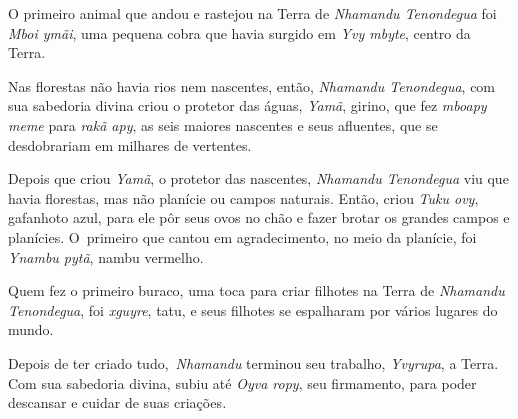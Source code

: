 
O primeiro animal que andou e rastejou na Terra de \emph{Nhamandu
Tenondegua} foi \emph{Mboi ymãi}, uma pequena cobra que havia surgido em
\emph{Yvy mbyte}, centro da Terra.

Nas florestas não havia rios nem nascentes, então, \emph{Nhamandu
Tenondegua}, com sua sabedoria divina criou o protetor das águas,
\emph{Yamã}, girino, que fez \emph{mboapy meme} para \emph{rakã apy}, as
seis maiores nascentes e seus afluentes, que se desdobrariam em milhares
de vertentes.


Depois que criou \emph{Yamã}, o protetor das nascentes, \emph{Nhamandu
Tenondegua} viu que havia florestas, mas não planície ou campos
naturais. Então, criou \emph{Tuku ovy}, gafanhoto azul, para ele pôr
seus ovos no chão e fazer brotar os grandes campos e planícies. O~primeiro que cantou em agradecimento, no meio da planície, foi
\emph{Ynambu pytã}, nambu vermelho.


 

Quem fez o primeiro buraco, uma toca para criar filhotes na Terra de
\emph{Nhamandu Tenondegua}, foi \emph{xguyre}, tatu, e seus filhotes se
espalharam por vários lugares do mundo.

Depois de ter criado tudo,~\emph{Nhamandu} terminou seu trabalho,
\emph{Yvyrupa}, a Terra. Com sua sabedoria divina, subiu até \emph{Oyva
ropy}, seu firmamento, para poder descansar e cuidar de suas
criações\emph{.}

 

 
